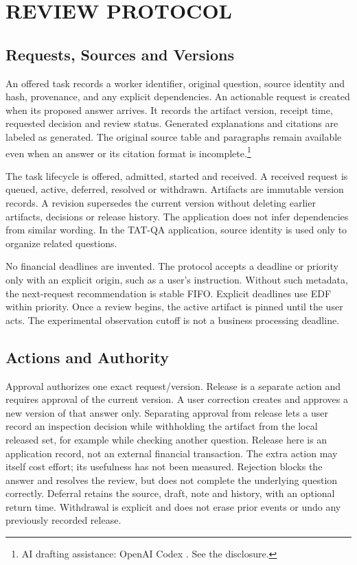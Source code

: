 \documentclass[a4paper,twoside]{article}
\newcommand{\credit}{\footnote{AI drafting assistance: OpenAI Codex \cite{codex}. See the disclosure.}}
\begin{document}
\section{REVIEW PROTOCOL}
\subsection{Requests, Sources and Versions}
An offered task records a worker identifier, original question, source identity
and hash, provenance, and any explicit dependencies. An actionable request is
created when its proposed answer arrives. It records the artifact version,
receipt time, requested decision and review status. Generated explanations and
citations are labeled as generated. The original source table and paragraphs
remain available even when an answer or its citation format is incomplete.\credit

The task lifecycle is offered, admitted, started and received. A received request
is queued, active, deferred, resolved or withdrawn. Artifacts are immutable version
records. A revision supersedes the current version without deleting earlier
artifacts, decisions or release history. The application does not infer dependencies
from similar wording. In the TAT-QA application, source identity is used only to
organize related questions.

No financial deadlines are invented. The protocol accepts a deadline or priority
only with an explicit origin, such as a user's instruction. Without such metadata,
the next-request recommendation is stable FIFO. Explicit deadlines use EDF within
priority. Once a review begins, the active artifact is pinned until the user acts.
The experimental observation cutoff is not a business processing deadline.

\subsection{Actions and Authority}
Approval authorizes one exact request/version. Release is a separate action and
requires approval of the current version. A user correction creates and approves
a new version of that answer only. Separating approval from release lets a user
record an inspection decision while withholding the artifact from the local released
set, for example while checking another question. Release here is an application
record, not an external financial transaction. The extra action may itself cost
effort; its usefulness has not been measured. Rejection blocks the answer and resolves the
review, but does not complete the underlying question correctly. Deferral retains
the source, draft, note and history, with an optional return time. Withdrawal is
explicit and does not erase prior events or undo any previously recorded release.
\end{document}
